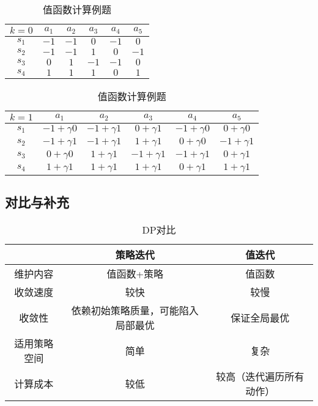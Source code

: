 \documentclass[
12pt, %
a4paper, 
oneside, %
headinclude,footinclude, %
]{scrartcl}
\begin{document}
\begin{table}[H]
\small
\centering
\begin{tabular}{|c|c|c|c|c|c|}
\hline
$ k = 0 $ & $ a_1 $ & $ a_2 $ & $ a_3 $ & $ a_4 $ & $ a_5 $ \\
\hline
$ s_1 $ & $ -1 $ & $ -1 $ & $ 0 $ & $ -1 $ & $ 0 $ \\
\hline
$ s_2 $ & $ -1 $ & $ -1 $ & $ 1 $ & $ 0 $ & $ -1 $ \\
\hline
$ s_3 $ & $ 0 $ & $ 1 $ & $ -1 $ & $ -1 $ & $ 0 $ \\
\hline
$ s_4 $ & $ 1 $ & $ 1 $ & $ 1 $ & $ 0 $ & $ 1 $ \\
\hline
\end{tabular}
\begin{tabular}{|c|c|c|c|c|c|}
\hline
$ k = 1 $ & $ a_1 $ & $ a_2 $ & $ a_3 $ & $ a_4 $ & $ a_5 $ \\
\hline
$ s_1 $ & $ -1 + \gamma 0 $ & $ -1 + \gamma 1 $ & $ 0 + \gamma 1 $ & $ -1 + \gamma 0 $ & $ 0 + \gamma 0 $ \\
\hline
$ s_2 $ & $ -1 + \gamma 1 $ & $ -1 + \gamma 1 $ & $ 1 + \gamma 1 $ & $ 0 + \gamma 0 $ & $ -1 + \gamma 1 $ \\
\hline
$ s_3 $ & $ 0 + \gamma 0 $ & $ 1 + \gamma 1 $ & $ -1 + \gamma 1 $ & $ -1 + \gamma 1 $ & $ 0 + \gamma 1 $ \\
\hline
$ s_4 $ & $ 1 + \gamma 1 $ & $ 1 + \gamma 1 $ & $ 1 + \gamma 1 $ & $ 0 + \gamma 1 $ & $ 1 + \gamma 1 $ \\
\hline
\end{tabular}
\caption{值函数计算例题}
\end{table}
\subsection[对比与补充]{对比与补充}\label{sec:DP back}
\begin{table}[H]
\centering
\begin{tabular}{|c|c|c|}
\hline
& 策略迭代 & 值迭代 \\
\hline
维护内容 & 值函数+策略 & 值函数 \\
\hline
收敛速度 & 较快 & 较慢 \\
\hline
收敛性 & 依赖初始策略质量，可能陷入局部最优 & 保证全局最优 \\
\hline
适用策略空间 & 简单 & 复杂 \\
\hline
计算成本 & 较低 & 较高（迭代遍历所有动作） \\
\hline
\end{tabular}
\caption{DP对比}
\end{table}
\end{document}
